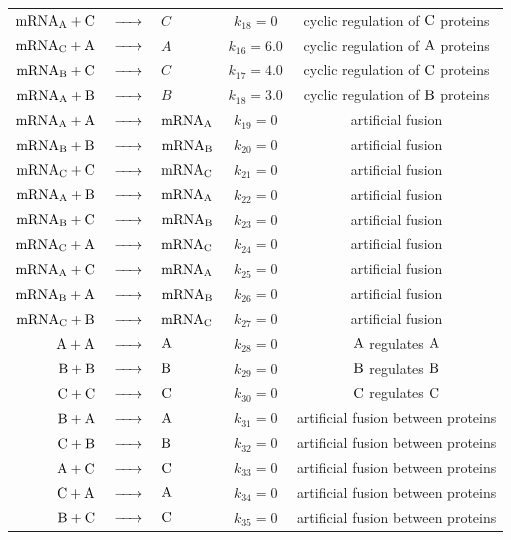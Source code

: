 \documentclass[oneside, abstracton, titlepage]{scrartcl}
\begin{document}
\begin{table}
\begin{tabular}{rclcc}
			$\ce{mRNA_A + C}$ &$\ce{->}$& $C$ & $k_{18} = 0$ & cyclic regulation of $\ce{C}$ proteins\\
			$\ce{mRNA_C + A}$ &$\ce{->}$& $A$ & $k_{16} = 6.0$ & cyclic regulation of $\ce{A}$ proteins\\
			$\ce{mRNA_B + C}$ &$\ce{->}$& $C$ & $k_{17} = 4.0$ & cyclic regulation of $\ce{C}$ proteins\\
			$\ce{mRNA_A + B}$ &$\ce{->}$& $B$ & $k_{18} = 3.0$ & cyclic regulation of $\ce{B}$ proteins\\
			$\ce{mRNA_A + A}$ &$\ce{->}$& $\ce{mRNA_A}$ & $k_{19} = 0$ & artificial fusion\\
			$\ce{mRNA_B + B}$ &$\ce{->}$& $\ce{mRNA_B}$ & $k_{20} = 0$ & artificial fusion\\
			$\ce{mRNA_C + C}$ &$\ce{->}$& $\ce{mRNA_C}$ & $k_{21} = 0$ & artificial fusion\\
			$\ce{mRNA_A + B}$ &$\ce{->}$& $\ce{mRNA_A}$ & $k_{22} = 0$ & artificial fusion\\
			$\ce{mRNA_B + C}$ &$\ce{->}$& $\ce{mRNA_B}$ & $k_{23} = 0$ & artificial fusion\\
			$\ce{mRNA_C + A}$ &$\ce{->}$& $\ce{mRNA_C}$ & $k_{24} = 0$ & artificial fusion\\
			$\ce{mRNA_A + C}$ &$\ce{->}$& $\ce{mRNA_A}$ & $k_{25} = 0$ & artificial fusion\\
			$\ce{mRNA_B + A}$ &$\ce{->}$& $\ce{mRNA_B}$ & $k_{26} = 0$ & artificial fusion\\
			$\ce{mRNA_C + B}$ &$\ce{->}$& $\ce{mRNA_C}$ & $k_{27} = 0$ & artificial fusion\\
			$\ce{A + A}$ &$\ce{->}$& $\ce{A}$ & $k_{28} = 0$ & $\ce{A}$ regulates $\ce{A}$\\
			$\ce{B + B}$ &$\ce{->}$& $\ce{B}$ & $k_{29} = 0$ & $\ce{B}$ regulates $\ce{B}$\\
			$\ce{C + C}$ &$\ce{->}$& $\ce{C}$ & $k_{30} = 0$ & $\ce{C}$ regulates $\ce{C}$\\
			$\ce{B + A}$ &$\ce{->}$& $\ce{A}$ & $k_{31} = 0$ & artificial fusion between proteins\\
			$\ce{C + B}$ &$\ce{->}$& $\ce{B}$ & $k_{32} = 0$ & artificial fusion between proteins\\
			$\ce{A + C}$ &$\ce{->}$& $\ce{C}$ & $k_{33} = 0$ & artificial fusion between proteins\\
			$\ce{C + A}$ &$\ce{->}$& $\ce{A}$ & $k_{34} = 0$ & artificial fusion between proteins\\
			$\ce{B + C}$ &$\ce{->}$& $\ce{C}$ & $k_{35} = 0$ & artificial fusion between proteins\\

\end{tabular}
\end{table}
\end{document}
